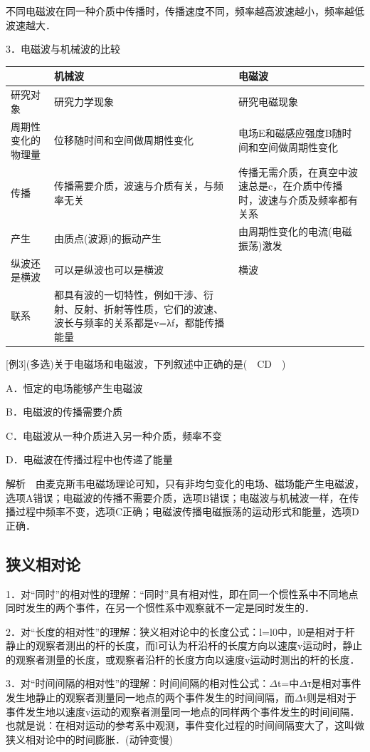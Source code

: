 不同电磁波在同一种介质中传播时，传播速度不同，频率越高波速越小，频率越低波速越大．

3．电磁波与机械波的比较

\begin{longtable}[]{@{}lll@{}}
\toprule
& 机械波 & 电磁波\tabularnewline
\midrule
\endhead
研究对象 & 研究力学现象 & 研究电磁现象\tabularnewline
周期性变化的物理量 & 位移随时间和空间做周期性变化 &
电场E和磁感应强度B随时间和空间做周期性变化\tabularnewline
传播 & 传播需要介质，波速与介质有关，与频率无关 &
传播无需介质，在真空中波速总是c，在介质中传播时，波速与介质及频率都有关系\tabularnewline
产生 & 由质点(波源)的振动产生 &
由周期性变化的电流(电磁振荡)激发\tabularnewline
纵波还是横波 & 可以是纵波也可以是横波 & 横波\tabularnewline
联系 &
都具有波的一切特性，例如干涉、衍射、反射、折射等性质，它们的波速、波长与频率的关系都是v=λf，都能传播能量
&\tabularnewline
\bottomrule
\end{longtable}

{[}例3{]}(多选)关于电磁场和电磁波，下列叙述中正确的是(　CD　)

A．恒定的电场能够产生电磁波

B．电磁波的传播需要介质

C．电磁波从一种介质进入另一种介质，频率不变

D．电磁波在传播过程中也传递了能量

解析　由麦克斯韦电磁场理论可知，只有非均匀变化的电场、磁场能产生电磁波，选项A错误；电磁波的传播不需要介质，选项B错误；电磁波与机械波一样，在传播过程中频率不变，选项C正确；电磁波传播电磁振荡的运动形式和能量，选项D正确．

\subsection{狭义相对论}

1．对``同时''的相对性的理解：``同时''具有相对性，即在同一个惯性系中不同地点同时发生的两个事件，在另一个惯性系中观察就不一定是同时发生的．

2．对``长度的相对性''的理解：狭义相对论中的长度公式：l=l0中，l0是相对于杆静止的观察者测出的杆的长度，而l可认为杆沿杆的长度方向以速度v运动时，静止的观察者测量的长度，或观察者沿杆的长度方向以速度v运动时测出的杆的长度．

3．对``时间间隔的相对性''的理解：时间间隔的相对性公式：$\Delta$t=中$\Delta$τ是相对事件发生地静止的观察者测量同一地点的两个事件发生的时间间隔，而$\Delta$t则是相对于事件发生地以速度v运动的观察者测量同一地点的同样两个事件发生的时间间隔．也就是说：在相对运动的参考系中观测，事件变化过程的时间间隔变大了，这叫做狭义相对论中的时间膨胀．(动钟变慢)

